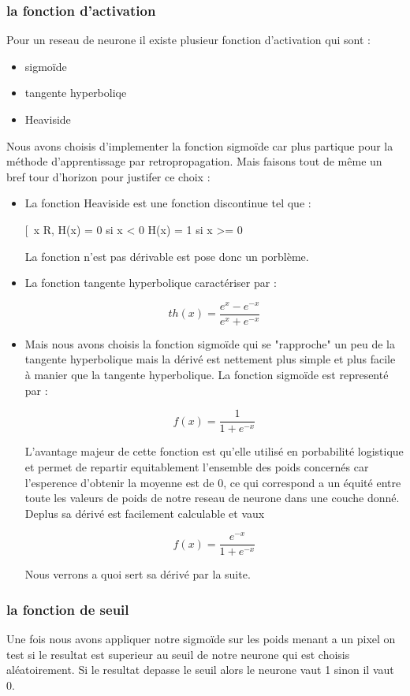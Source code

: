 \subsubsection{la fonction d'activation}
Pour un reseau de neurone il existe plusieur fonction d'activation qui sont :
\begin{itemize}
\item sigmoïde
\item tangente hyperboliqe
\item Heaviside
\end{itemize}
\vspace{0.5cm}
Nous avons choisis d'implementer la fonction sigmoïde car plus partique pour la méthode d'apprentissage par retropropagation.
Mais faisons tout de même un bref tour d'horizon pour justifer ce choix :
\begin{itemize}
\item
La fonction Heaviside est une fonction discontinue tel que :
\begin{center}
[\
  \forall x \in R, H(x) =  0 si x < 0 H(x) = 1 si x >= 0
 \]
\end{center}
La fonction n'est pas dérivable est pose donc un porblème.
\item
La fonction tangente hyperbolique caractériser par :
\begin{center}
\[ th(x) = \frac{e^{x} - e^{-x}}{e^{x} + e^{-x}}\]
\end{center}
\item
Mais nous avons choisis la fonction sigmoïde qui se "rapproche" un peu de la tangente hyperbolique mais la dérivé est nettement plus simple et plus facile à manier que la tangente hyperbolique. La fonction sigmoïde est representé par :
\begin{center}
\[ f(x) = \frac{1}{1 + e^{-x}} \]
\end{center}
L'avantage majeur de cette fonction est qu'elle utilisé en porbabilité logistique et permet de repartir equitablement l'ensemble des poids concernés car l'esperence d'obtenir la moyenne est de 0, ce qui correspond a un équité entre toute les valeurs de poids de notre reseau de neurone dans une couche donné.
Deplus sa dérivé est facilement calculable et vaux
\begin{center}
\[ f(x) = \frac{e^{-x}}{1+e^{-x}} \]
\end{center}
Nous verrons a quoi sert sa dérivé par la suite.
\end{itemize}

\subsubsection{la fonction de seuil}
Une fois nous avons appliquer notre sigmoïde sur les poids menant a un pixel on test si le resultat est superieur au seuil de notre neurone qui est choisis aléatoirement.
Si le resultat depasse le seuil alors le neurone vaut 1 sinon il vaut 0.

